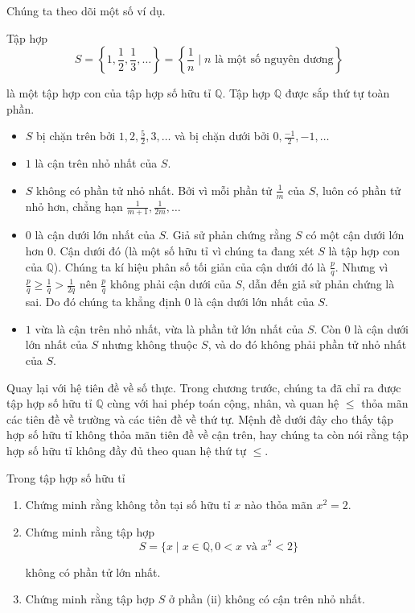 Chúng ta theo dõi một số ví dụ.
\begin{example}
    Tập hợp
    \[
        S = \left\{ 1, \frac{1}{2}, \frac{1}{3}, \ldots \right\} = \left\{ \frac{1}{n} \mid \text{$n$ là một số nguyên dương} \right\}
    \]

    là một tập hợp con của tập hợp số hữu tỉ $\mathbb{Q}$. Tập hợp $\mathbb{Q}$ được sắp thứ tự toàn phần.
    \begin{itemize}
        \item $S$ bị chặn trên bởi $1, 2, \frac{5}{2}, 3, \ldots$ và bị chặn dưới bởi $0, \frac{-1}{2}, -1, \ldots$
        \item $1$ là cận trên nhỏ nhất của $S$.
        \item $S$ không có phần tử nhỏ nhất. Bởi vì mỗi phần tử $\frac{1}{m}$ của $S$, luôn có phần tử nhỏ hơn, chẳng hạn $\frac{1}{m+1}, \frac{1}{2m}, \ldots$
        \item $0$ là cận dưới lớn nhất của $S$. Giả sử phản chứng rằng $S$ có một cận dưới lớn hơn $0$. Cận dưới đó (là một số hữu tỉ vì chúng ta đang xét $S$ là tập hợp con của $\mathbb{Q}$). Chúng ta kí hiệu phân số tối giản của cận dưới đó là $\frac{p}{q}$. Nhưng vì $\frac{p}{q}\geq \frac{1}{q} > \frac{1}{2q}$ nên $\frac{p}{q}$ không phải cận dưới của $S$, dẫn đến giả sử phản chứng là sai. Do đó chúng ta khẳng định $0$ là cận dưới lớn nhất của $S$.
        \item $1$ vừa là cận trên nhỏ nhất, vừa là phần tử lớn nhất của $S$. Còn $0$ là cận dưới lớn nhất của $S$ nhưng không thuộc $S$, và do đó không phải phần tử nhỏ nhất của $S$.
    \end{itemize}
\end{example}

Quay lại với hệ tiên đề về số thực. Trong chương trước, chúng ta đã chỉ ra được tập hợp số hữu tỉ $\mathbb{Q}$ cùng với hai phép toán cộng, nhân, và quan hệ $\leq$ thỏa mãn các tiên đề về trường và các tiên đề về thứ tự. Mệnh đề dưới đây cho thấy tập hợp số hữu tỉ không thỏa mãn tiên đề về cận trên, hay chúng ta còn nói rằng tập hợp số hữu tỉ không đầy đủ theo quan hệ thứ tự $\leq$.

\begin{proposition}\label{proposition:irrational-cut}
    Trong tập hợp số hữu tỉ
    \begin{enumerate}[label={(\roman*)}]
        \item Chứng minh rằng không tồn tại số hữu tỉ $x$ nào thỏa mãn $x^{2} = 2$.
        \item Chứng minh rằng tập hợp
              \[
                  S = \{ x \mid x\in\mathbb{Q}, 0 < x \text{ và } x^{2} < 2 \}
              \]

              không có phần tử lớn nhất.
        \item Chứng minh rằng tập hợp $S$ ở phần (ii) không có cận trên nhỏ nhất.
    \end{enumerate}
\end{proposition}

